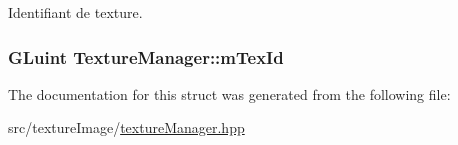 Identifiant de texture. 

\hypertarget{struct_texture_manager_ac97817f882f366cd772d751f1179fb87}{
\subsubsection[{m\+Tex\+Id}]{\setlength{\rightskip}{0pt plus 5cm}G\+Luint Texture\+Manager\+::m\+Tex\+Id}}\label{struct_texture_manager_ac97817f882f366cd772d751f1179fb87}


The documentation for this struct was generated from the following file\+:\begin{DoxyCompactItemize}
\item 
src/texture\+Image/\hyperlink{texture_manager_8hpp}{texture\+Manager.\+hpp}\end{DoxyCompactItemize}
